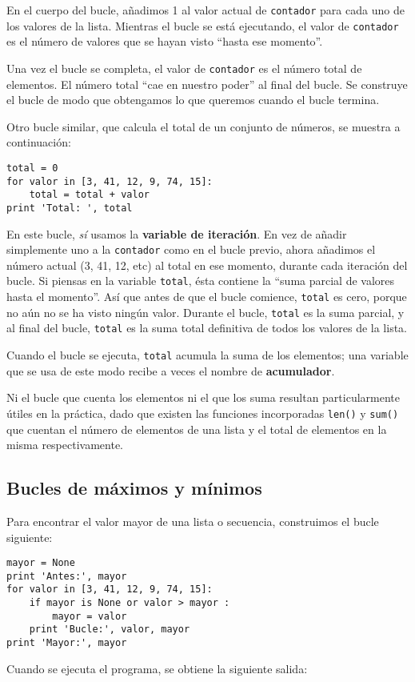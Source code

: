 En el cuerpo del bucle, añadimos 1 al valor actual de {\tt contador}
para cada uno de los valores de la lista. Mientras el bucle se está ejecutando, el
valor de {\tt contador} es el número de valores que se hayan visto ``hasta ese momento''.

Una vez el bucle se completa, el valor de {\tt contador} es el número total
de elementos. El número total ``cae en nuestro poder'' al final del
bucle. Se construye el bucle de modo que obtengamos lo que queremos cuando el
bucle termina.

Otro bucle similar, que calcula el total de un conjunto de números,
se muestra a continuación:

\beforeverb
\begin{verbatim}
total = 0
for valor in [3, 41, 12, 9, 74, 15]:
    total = total + valor
print 'Total: ', total
\end{verbatim}
\afterverb
%
En este bucle, \emph{sí} usamos la {\bf variable de iteración}.
En vez de añadir simplemente uno a la {\tt contador} como en el bucle previo,
ahora añadimos el número actual (3, 41, 12, etc) al total en ese momento,
durante cada iteración del bucle.
Si piensas en la variable {\tt total}, ésta contiene la
``suma parcial de valores hasta el momento''. Así que antes de que el bucle
comience, {\tt total} es cero, porque no aún no se ha visto ningún valor.
Durante el bucle, {\tt total} es la suma parcial, y al final del bucle,
{\tt total} es la suma total definitiva de todos los valores
de la lista.

Cuando el bucle se ejecuta, {\tt total} acumula la suma de los elementos;
una variable que se usa de este modo recibe a veces el nombre de
{\bf acumulador}.

Ni el bucle que cuenta los elementos ni el que los suma resultan particularmente
útiles en la práctica, dado que existen las funciones incorporadas
{\tt len()} y {\tt sum()} que cuentan el número de elementos
de una lista y el total de elementos en la misma
respectivamente.

\subsection{Bucles de máximos y mínimos}

\label{maximumloop}
Para encontrar el valor mayor de una lista o secuencia, construimos
el bucle siguiente:

\beforeverb
\begin{verbatim}
mayor = None
print 'Antes:', mayor
for valor in [3, 41, 12, 9, 74, 15]:
    if mayor is None or valor > mayor :
        mayor = valor
    print 'Bucle:', valor, mayor
print 'Mayor:', mayor
\end{verbatim}
\afterverb
%
Cuando se ejecuta el programa, se obtiene la siguiente salida:


